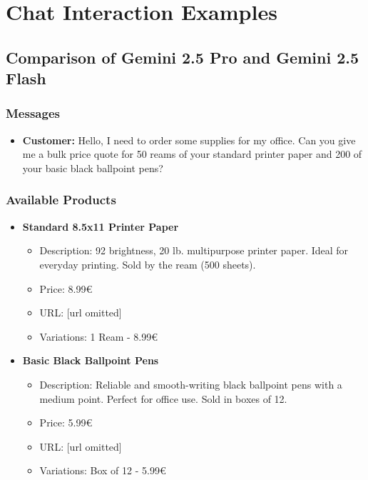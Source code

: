 \chapter{Chat Interaction Examples}

\section{Comparison of Gemini 2.5 Pro and Gemini 2.5 Flash}
\label{sec:pro_vs_flash}

\subsection*{Messages}
\begin{itemize}
    \item \textbf{Customer:} Hello, I need to order some supplies for my office. Can you give me a bulk price quote for 50 reams of your standard printer paper and 200 of your basic black ballpoint pens?
\end{itemize}

\subsection*{Available Products}
\begin{itemize}
    \item \textbf{Standard 8.5x11 Printer Paper}
          \begin{itemize}
              \item Description: 92 brightness, 20 lb. multipurpose printer paper. Ideal for everyday printing. Sold by the ream (500 sheets).
              \item Price: 8.99€
              \item URL: [url omitted]
              \item Variations: 1 Ream - 8.99€
          \end{itemize}

    \item \textbf{Basic Black Ballpoint Pens}
          \begin{itemize}
              \item Description: Reliable and smooth-writing black ballpoint pens with a medium point. Perfect for office use. Sold in boxes of 12.
              \item Price: 5.99€
              \item URL: [url omitted]
              \item Variations: Box of 12 - 5.99€
          \end{itemize}
\end{itemize}

